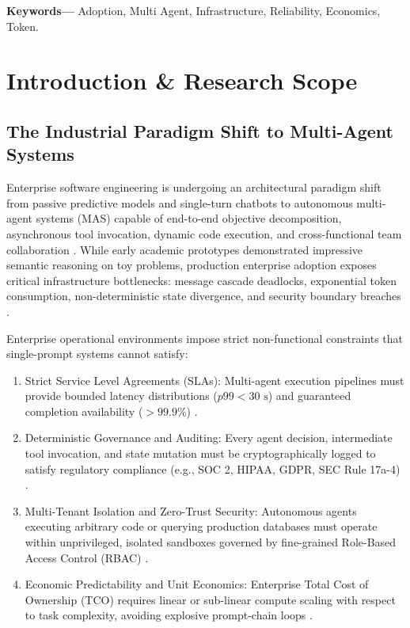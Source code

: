 \documentclass[10pt,twocolumn,letterpaper]{article}
\begin{document}
\noindent\textbf{Keywords---} Adoption, Multi Agent, Infrastructure, Reliability, Economics, Token.







\section{Introduction \& Research Scope}



\subsection{The Industrial Paradigm Shift to Multi-Agent Systems}


Enterprise software engineering is undergoing an architectural paradigm shift from passive predictive models and single-turn chatbots to autonomous multi-agent systems (MAS) capable of end-to-end objective decomposition, asynchronous tool invocation, dynamic code execution, and cross-functional team collaboration \cite{arxiv_2405_01543,arxiv_2005_14165}. While early academic prototypes demonstrated impressive semantic reasoning on toy problems, production enterprise adoption exposes critical infrastructure bottlenecks: message cascade deadlocks, exponential token consumption, non-deterministic state divergence, and security boundary breaches \cite{arxiv_2404_04289,crossref_10_1016_j_aei_2026_104392}.

Enterprise operational environments impose strict non-functional constraints that single-prompt systems cannot satisfy:
\begin{enumerate}
  \item Strict Service Level Agreements (SLAs): Multi-agent execution pipelines must provide bounded latency distributions ($p99 < 30\text{ s}$) and guaranteed completion availability ($>99.9\%$) \cite{crossref_10_1108_jeim_12_2025_1269}.
  \item Deterministic Governance and Auditing: Every agent decision, intermediate tool invocation, and state mutation must be cryptographically logged to satisfy regulatory compliance (e.g., SOC 2, HIPAA, GDPR, SEC Rule 17a-4) \cite{arxiv_2411_15594}.
  \item Multi-Tenant Isolation and Zero-Trust Security: Autonomous agents executing arbitrary code or querying production databases must operate within unprivileged, isolated sandboxes governed by fine-grained Role-Based Access Control (RBAC) \cite{arxiv_2404_04289,doaj_001772c2113c476d9d5d40452c8e10e1}.
  \item Economic Predictability and Unit Economics: Enterprise Total Cost of Ownership (TCO) requires linear or sub-linear compute scaling with respect to task complexity, avoiding explosive prompt-chain loops \cite{arxiv_2406_00584}.
\end{enumerate}
\end{document}

